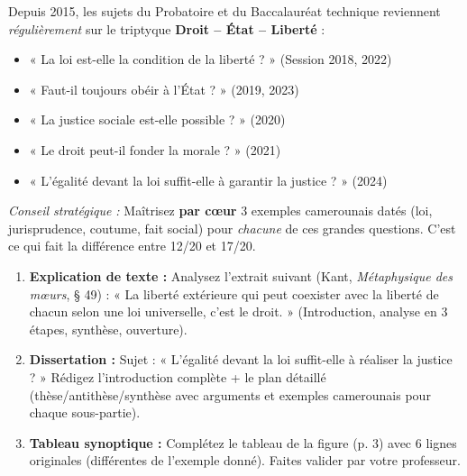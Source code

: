 \documentclass[11pt]{article}
\begin{document}
\begin{savaistu}
Depuis 2015, les sujets du Probatoire et du Baccalauréat technique reviennent \emph{régulièrement} sur le triptyque \textbf{Droit -- État -- Liberté} :
\begin{itemize}
    \item « La loi est-elle la condition de la liberté ? » (Session 2018, 2022)
    \item « Faut-il toujours obéir à l'État ? » (2019, 2023)
    \item « La justice sociale est-elle possible ? » (2020)
    \item « Le droit peut-il fonder la morale ? » (2021)
    \item « L'égalité devant la loi suffit-elle à garantir la justice ? » (2024)
\end{itemize}
\emph{Conseil stratégique :} Maîtrisez \textbf{par cœur} 3 exemples camerounais datés (loi, jurisprudence, coutume, fait social) pour \emph{chacune} de ces grandes questions. C'est ce qui fait la différence entre 12/20 et 17/20.
\end{savaistu}

\begin{exercice}
\begin{enumerate}
    \item \textbf{Explication de texte :} Analysez l'extrait suivant (Kant, \emph{Métaphysique des mœurs}, § 49) : « La liberté extérieure qui peut coexister avec la liberté de chacun selon une loi universelle, c'est le droit. » (Introduction, analyse en 3 étapes, synthèse, ouverture).
    \item \textbf{Dissertation :} Sujet : « L'égalité devant la loi suffit-elle à réaliser la justice ? » Rédigez l'introduction complète + le plan détaillé (thèse/antithèse/synthèse avec arguments et exemples camerounais pour chaque sous-partie).
    \item \textbf{Tableau synoptique :} Complétez le tableau de la figure (p. 3) avec 6 lignes originales (différentes de l'exemple donné). Faites valider par votre professeur.
\end{enumerate}
\end{exercice}
\end{document}
